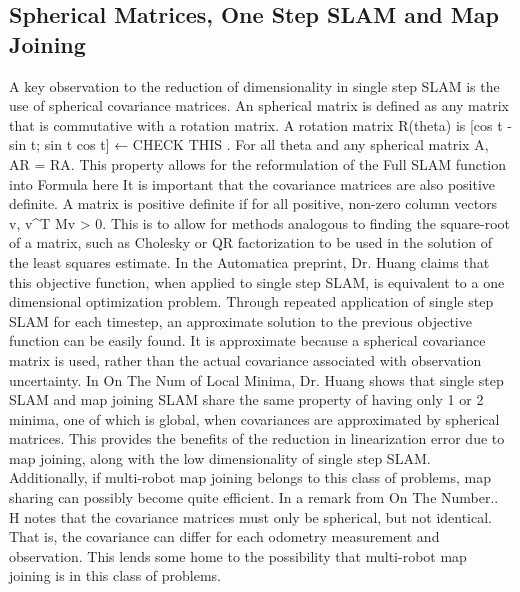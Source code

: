 \subsection{ Spherical Matrices, One Step SLAM and Map Joining}
A key observation to the reduction of dimensionality in single step SLAM is the 	use of spherical covariance matrices.  An spherical matrix is defined as any matrix that is commutative with a rotation matrix.  A rotation matrix R(theta) is [cos t -sin t; sin t cos t] ← CHECK THIS  .  For all theta and any spherical matrix A, AR = RA.  
This property allows for the reformulation of the Full SLAM function into 
Formula here
It is important that the covariance matrices are also positive definite.  A matrix is positive definite if for all positive, non-zero column vectors v, v^T Mv > 0. This is to allow for methods analogous to finding the square-root of a matrix, such as Cholesky or QR factorization to be used in the solution of the least squares estimate. 
In the Automatica preprint, Dr. Huang claims that this objective function, when applied to single step SLAM, is equivalent to a one dimensional optimization problem.  Through repeated application of single step SLAM for each timestep, an approximate solution to the previous objective function can be easily found.  It is approximate because a spherical covariance matrix is used, rather than the actual covariance associated with observation uncertainty.
In On The Num of Local Minima, Dr. Huang shows that single step SLAM and map joining SLAM share the same property of having only 1 or 2 minima, one of which is global, when covariances are approximated by spherical matrices.  This provides the benefits of the reduction in linearization error due to map joining, along with the low dimensionality of single step SLAM.  Additionally, if multi-robot map joining belongs to this class of problems, map sharing can possibly become quite efficient.
In a remark from On The Number.. H notes that the covariance matrices must only be spherical, but not identical.  That is, the covariance can differ for each odometry measurement and observation.  This lends some home to the possibility that multi-robot map joining is in this class of problems.

